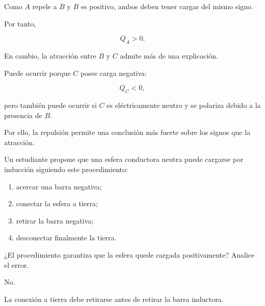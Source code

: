 \begin{explicacion}

Como \(A\) repele a \(B\) y \(B\) es positivo, ambos deben tener cargas del
mismo signo.

Por tanto,

\[
\boxed{
Q_A>0
}.
\]

En cambio, la atracción entre \(B\) y \(C\) admite más de una explicación.

Puede ocurrir porque \(C\) posee carga negativa:

\[
Q_C<0,
\]

pero también puede ocurrir si \(C\) es eléctricamente neutro y se polariza
debido a la presencia de \(B\).

Por ello, la repulsión permite una conclusión más fuerte sobre los signos
que la atracción.

\end{explicacion}



\begin{ejercicio}

Un estudiante propone que una esfera conductora neutra puede cargarse por
inducción siguiendo este procedimiento:

\begin{enumerate}
    \item acercar una barra negativa;
    \item conectar la esfera a tierra;
    \item retirar la barra negativa;
    \item desconectar finalmente la tierra.
\end{enumerate}

¿El procedimiento garantiza que la esfera quede cargada positivamente?
Analice el error.

\end{ejercicio}

\begin{respuesta}

No.

La conexión a tierra debe retirarse antes de retirar la barra inductora.

\end{respuesta}

